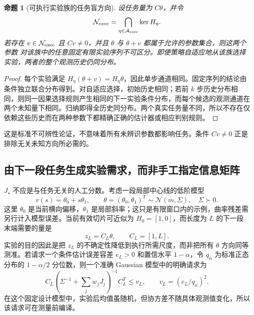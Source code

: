 \documentclass[11pt,a4paper]{article}
\numberwithin{equation}{section}
\newtheorem{proposition}[theorem]{命题}
\theoremstyle{definition}
\begin{document}
\begin{proposition}[可执行实验族的任务盲方向]
\label{cmp:nullspace}
设任务量为 $C\theta$，并令
\begin{equation}
 \mathcal N_{\rm exec}=\bigcap_{\eta\in\mathcal A_{\rm exec}}\ker H_\eta.
\end{equation}
若存在 $v\in\mathcal N_{\rm exec}$ 且 $Cv\ne0$，并且 $\theta$ 与 $\theta+v$ 都属于允许的参数集合，则这两个参数 对该族中的任意固定有限实验序列不可区分。即使策略自适应地从该族选择实验，两者的整个观测历史仍同分布。
\end{proposition}
\begin{proof}
每个实验满足 $H_\eta(\theta+v)=H_\eta\theta$，因此单步通道相同。固定序列的结论由条件独立联合分布得到。对自适应选择，初始历史相同；若前 $k$ 步历史分布相同，则同一因果选择规则产生相同的下一实验条件分布，而每个候选的观测通道在两个未知量下相同。归纳即得全历史同分布。两个真实任务量不同，所以不存在仅依赖这些历史而在两种参数下都精确正确的估计器或相应判别规则。
\end{proof}

这是标准不可辨性论证，不意味着所有未辨识参数都影响任务。条件 $Cv\ne0$ 正是排除无关未知方向所必需的。


\subsection{由下一段任务生成实验需求，而非手工指定信息矩阵}
\label{cmp:task-request}

$J_\star$ 不应是与任务无关的人工分数。考虑一段局部中心线的低阶模型
\begin{equation}
 r(s)=\theta_0+s\theta_1,\qquad
 \theta=(\theta_0,\theta_1)^T\sim\mathcal N(m,\Sigma),\quad\Sigma\succ0.
\end{equation}
这里 $\theta_0$ 是当前横向偏移，$\theta_1$ 是局部斜率；这只是有限窗口内的示例，曲率残差需另行计入模型误差。当前有效切片可近似为 $H_0=[1,0]$，而长度为 $L$ 的下一段末端需要的量是
\begin{equation}
 z_L=C_L\theta,\qquad C_L=[1,L].
\end{equation}
实验的目的因此是把 $z_L$ 的不确定性降低到执行所需尺度，而非把所有 $\theta$ 方向同等测准。若请求一个条件估计误差容差 $e_L>0$ 和置信水平 $1-\alpha$，令 $q_\alpha$ 为标准正态分布的 $1-\alpha/2$ 分位数，则一个准确 Gaussian 模型中的明确请求为
\begin{equation}
 C_L\left(\Sigma^{-1}+\sum_jw_jJ_j\right)^{-1}C_L^T
 \le v_L,\qquad v_L=(e_L/q_\alpha)^2.
 \label{cmp:future-variance-request}
\end{equation}
在这个固定设计模型中，实验后均值虽随机，但协方差不随具体观测值变化，所以该请求可在测量前编译。
\end{document}
